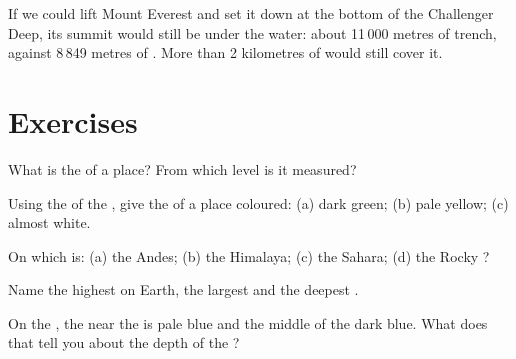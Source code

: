 \begin{example}\label{ex:g4:world-physical-map:everest-in-deep}
If we could lift Mount Everest and set it down at the bottom of the
Challenger Deep, its summit would still be under the water: about 11\,000
metres of trench, against 8\,849 metres of . More than 2
kilometres of  would still cover it.
\end{example}

\section{Exercises}

\begin{exercise}[$\star$]\label{exo:g4:world-physical-map:1}
What is the  of a place? From which level is it measured?
\end{exercise}

\begin{exercise}[$\star$]\label{exo:g4:world-physical-map:2}
Using the  of the , give the  of a place
coloured: (a) dark green; (b) pale yellow; (c) almost white.
\end{exercise}

\begin{exercise}[$\star$]\label{exo:g4:world-physical-map:3}
On which  is: (a) the Andes; (b) the Himalaya; (c) the Sahara;
(d) the Rocky ?
\end{exercise}

\begin{exercise}[$\star$]\label{exo:g4:world-physical-map:4}
Name the highest  on Earth, the largest  and the deepest .
\end{exercise}

\begin{exercise}[$\star$]\label{exo:g4:world-physical-map:5}
On the , the  near the  is pale blue and the middle of
the  dark blue. What does that tell you about the depth of the ?
\end{exercise}

